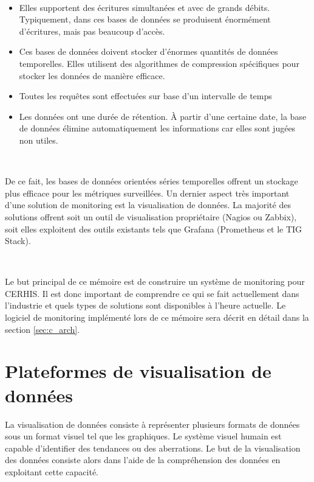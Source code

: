~

\begin{itemize}
  \item Elles supportent des écritures simultanées et avec de grands débits. Typiquement, dans ces bases de données se produisent énormément d'écritures, mais pas beaucoup d'accès.
  \item Ces bases de données doivent stocker d'énormes quantités de données temporelles. Elles utilisent des algorithmes de compression spécifiques pour stocker les données de manière efficace. \cite{di2007efficient}
  \item Toutes les requêtes sont effectuées sur base d'un intervalle de temps
  \item Les données ont une durée de rétention. À partir d'une certaine date, la base de données élimine automatiquement les informations car elles sont jugées non utiles.
\end{itemize}

~

\noindent
De ce fait, les bases de données orientées séries temporelles offrent un stockage plus efficace pour les métriques surveillées. Un dernier aspect très important d'une solution de monitoring est la visualisation de données. La majorité des solutions offrent soit un outil de visualisation propriétaire (Nagios ou Zabbix), soit elles exploitent des outils existants tels que Grafana (Prometheus et le TIG Stack).

~

\noindent
Le but principal de ce mémoire est de construire un système de monitoring pour CERHIS. Il est donc important de comprendre ce qui se fait actuellement dans l'industrie et quels types de solutions sont disponibles à l'heure actuelle. Le logiciel de monitoring implémenté lors de ce mémoire sera décrit en détail dans la section \ref{sec:c_arch}.


\section{Plateformes de visualisation de données}
\label{sec:data_vis}

\noindent
La visualisation de données consiste à représenter plusieurs formats de données sous un format visuel tel que les graphiques. Le système visuel humain est capable d'identifier des tendances ou des aberrations. Le but de la visualisation des données consiste alors dans l'aide de la compréhension des données en exploitant cette capacité. \cite{zoo_data}

